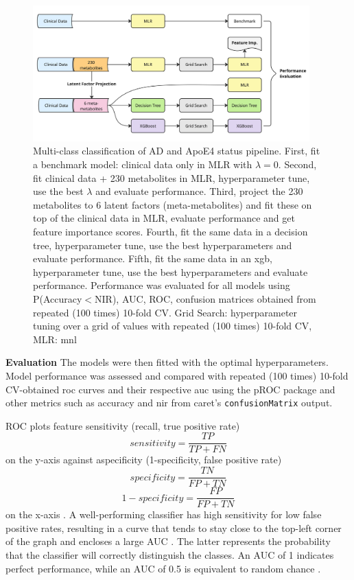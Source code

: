 \documentclass{amsart}
\begin{document}
\begin{figure}[H]
  \caption{\label{fig:flow} Multi-class classification of AD and ApoE4 status pipeline. First, fit a benchmark model: clinical data only in MLR with $\lambda=0$. Second, fit clinical data + 230 metabolites in MLR, hyperparameter tune, use the best $\lambda$ and evaluate performance. Third, project the 230 metabolites to 6 latent factors (meta-metabolites) and fit these on top of the clinical data in MLR, evaluate performance and get feature importance scores. Fourth, fit the same data in a decision tree, hyperparameter tune, use the best hyperparameters and evaluate performance. Fifth, fit the same data in an \acrfull{xgb}, hyperparameter tune, use the best hyperparameters and evaluate performance. Performance was evaluated for all models using P(Accuracy$<$NIR), AUC, ROC, confusion matrices obtained from repeated (100 times) 10-fold CV.
  Grid Search: hyperparameter tuning over a grid of values with repeated (100 times) 10-fold CV, MLR: \acrlong{mnl}}
  \includegraphics[width=0.95\textwidth]{figures/flowchart.jpg}
\end{figure}

\leavevmode\newline \textbf{Evaluation}\hspace{.25cm} The models were then fitted with the optimal hyperparameters. Model performance was assessed and compared with repeated (100 times) 10-fold CV-obtained \acrfull{roc} curves and their respective \acrfull{auc} using the \textsf{pROC} package \cite{pROC} and other metrics such as accuracy and \acrfull{nir} from \textsf{caret}'s \texttt{confusionMatrix} output.

ROC plots feature sensitivity (recall, true positive rate) \[ sensitivity = \frac{TP}{TP+FN}\] on the y-axis against aspecificity (1-specificity, false positive rate) 
\[ specificity = \frac{TN}{FP+TN}\]
\[ 1-specificity = \frac{FP}{FP+TN}\] on the x-axis \cite{James2023AnEdition}.
A well-performing classifier has high sensitivity for low false positive rates, resulting in a curve that tends to stay close to the top-left corner of the graph and encloses a large AUC \cite{James2023AnEdition}. The latter represents the probability that the classifier will correctly distinguish the classes. An AUC of 1 indicates perfect performance, while an AUC of 0.5 is equivalent to random chance \cite{James2023AnEdition}. 
\end{document}

